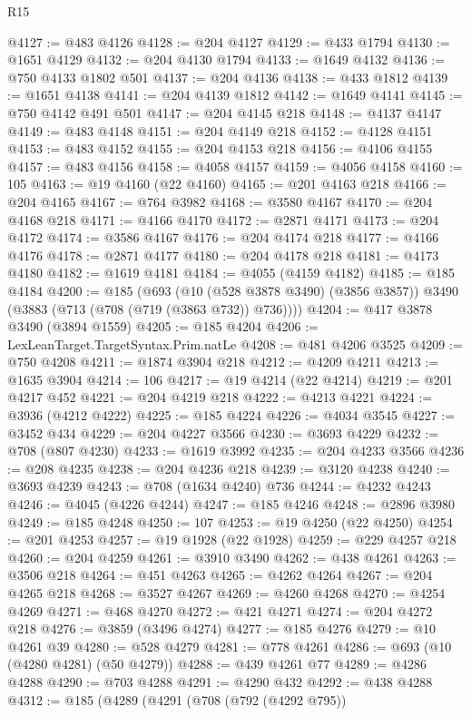 \begin{lexlean}{R15}
\begin{coremodule}
{{{{{{{{{{{@4127 := @483 @4126
@4128 := @204 @4127
@4129 := @433 @1794
@4130 := @1651 @4129
@4132 := @204 @4130 @1794
@4133 := @1649 @4132
@4136 := @750 @4133 @1802 @501
@4137 := @204 @4136
@4138 := @433 @1812
@4139 := @1651 @4138
@4141 := @204 @4139 @1812
@4142 := @1649 @4141
@4145 := @750 @4142 @491 @501
@4147 := @204 @4145 @218
@4148 := @4137 @4147
@4149 := @483 @4148
@4151 := @204 @4149 @218
@4152 := @4128 @4151
@4153 := @483 @4152
@4155 := @204 @4153 @218
@4156 := @4106 @4155
@4157 := @483 @4156
@4158 := @4058 @4157
@4159 := @4056 @4158
@4160 := 105
@4163 := @19 @4160 (@22 @4160)
@4165 := @201 @4163 @218
@4166 := @204 @4165
@4167 := @764 @3982
@4168 := @3580 @4167
@4170 := @204 @4168 @218
@4171 := @4166 @4170
@4172 := @2871 @4171
@4173 := @204 @4172
@4174 := @3586 @4167
@4176 := @204 @4174 @218
@4177 := @4166 @4176
@4178 := @2871 @4177
@4180 := @204 @4178 @218
@4181 := @4173 @4180
@4182 := @1619 @4181
@4184 := @4055 (@4159 @4182)
@4185 := @185 @4184
@4200 := @185
    (@693
      (@10 (@528 @3878 @3490) (@3856 @3857))
      @3490
      (@3883 (@713 (@708 (@719 (@3863 @732)) @736))))
@4204 := @417 @3878 @3490 (@3894 @1559)
@4205 := @185 @4204
@4206 := LexLeanTarget.TargetSyntax.Prim.natLe
@4208 := @481 @4206 @3525
@4209 := @750 @4208
@4211 := @1874 @3904 @218
@4212 := @4209 @4211
@4213 := @1635 @3904
@4214 := 106
@4217 := @19 @4214 (@22 @4214)
@4219 := @201 @4217 @452
@4221 := @204 @4219 @218
@4222 := @4213 @4221
@4224 := @3936 (@4212 @4222)
@4225 := @185 @4224
@4226 := @4034 @3545
@4227 := @3452 @434
@4229 := @204 @4227 @3566
@4230 := @3693 @4229
@4232 := @708 (@807 @4230)
@4233 := @1619 @3992
@4235 := @204 @4233 @3566
@4236 := @208 @4235
@4238 := @204 @4236 @218
@4239 := @3120 @4238
@4240 := @3693 @4239
@4243 := @708 (@1634 @4240) @736
@4244 := @4232 @4243
@4246 := @4045 (@4226 @4244)
@4247 := @185 @4246
@4248 := @2896 @3980
@4249 := @185 @4248
@4250 := 107
@4253 := @19 @4250 (@22 @4250)
@4254 := @201 @4253
@4257 := @19 @1928 (@22 @1928)
@4259 := @229 @4257 @218
@4260 := @204 @4259
@4261 := @3910 @3490
@4262 := @438 @4261
@4263 := @3506 @218
@4264 := @451 @4263
@4265 := @4262 @4264
@4267 := @204 @4265 @218
@4268 := @3527 @4267
@4269 := @4260 @4268
@4270 := @4254 @4269
@4271 := @468 @4270
@4272 := @421 @4271
@4274 := @204 @4272 @218
@4276 := @3859 (@3496 @4274)
@4277 := @185 @4276
@4279 := @10 @4261 @39
@4280 := @528 @4279
@4281 := @778 @4261
@4286 := @693 (@10 (@4280 @4281) (@50 @4279))
@4288 := @439 @4261 @77
@4289 := @4286 @4288
@4290 := @703 @4288
@4291 := @4290 @432
@4292 := @438 @4288
@4312 := @185
    (@4289
      (@4291
        (@708
          (@792 (@4292 @795))
}}}}}}}}}}}
\end{coremodule}
\end{lexlean}
